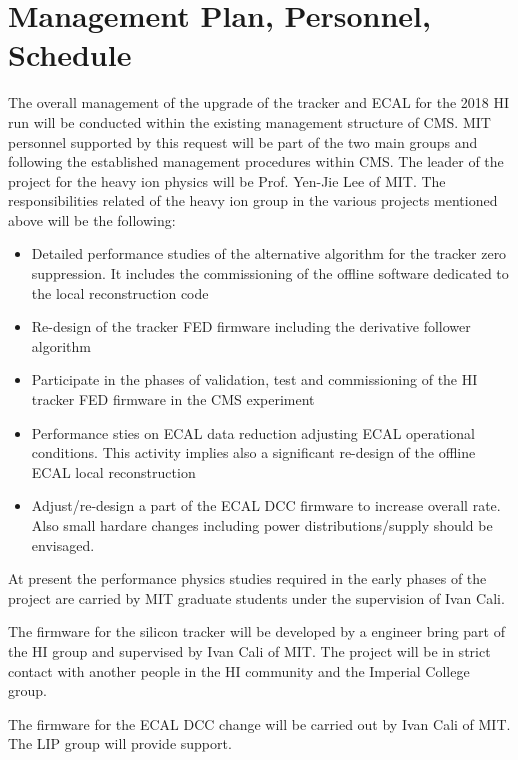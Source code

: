 \section{Management Plan, Personnel, Schedule}
\label{sec:management}

The overall management of the upgrade of the tracker and ECAL for the 2018 HI run will be conducted within the existing management structure of CMS. MIT personnel supported by this request will be part of the two main groups and following the established management procedures within CMS. The leader of the project for the heavy ion physics will be Prof. Yen-Jie Lee of MIT. The responsibilities related of the heavy ion group in the various projects mentioned above will be the following:

\begin{itemize}
\item Detailed performance studies of the alternative algorithm for the tracker zero suppression. It includes the
commissioning of the offline software dedicated to the local reconstruction code
\item Re-design of the tracker FED firmware including the derivative follower algorithm
\item Participate in the phases of validation, test and commissioning of the HI tracker FED firmware in the CMS experiment
\item Performance sties on ECAL data reduction adjusting ECAL operational conditions. This activity implies also a
significant re-design of the offline ECAL local reconstruction
\item Adjust/re-design a part of the ECAL DCC firmware to increase overall rate. Also small hardare changes including power distributions/supply should be envisaged. 
\end{itemize}

At present the performance physics studies required in the early phases of the project are carried by MIT graduate students under the supervision of Ivan Cali. 

 
The firmware for the silicon tracker will be developed by a engineer bring part of the HI group and supervised by Ivan Cali of MIT. The project will be in strict contact with another people in the HI community and the Imperial College group.

The firmware for the ECAL DCC change will be carried out by Ivan Cali of MIT. The LIP group will provide support.

